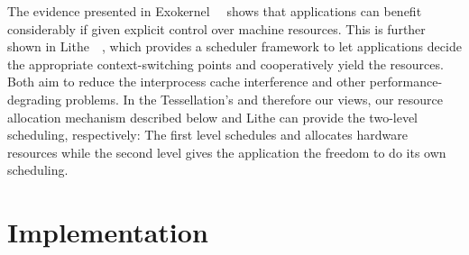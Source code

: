 \documentclass[letterpaper,twocolumn,11pt]{article}
\begin{document}
The evidence presented in Exokernel~\cite{Engler:1995:EOS:224056.224076}~\cite{Engler:1995:EOS:224057.224076} shows that applications can benefit considerably if given explicit control over machine resources. This is further shown in Lithe~\cite{Pan:2010:CPS:1809028.1806639}~\cite{Pan:2010:CPS:1806596.1806639}, which provides a scheduler framework to let applications decide the appropriate context-switching points and cooperatively yield the resources. Both aim to reduce the interprocess cache interference and other performance-degrading problems. In the Tessellation's and therefore our views, our resource allocation mechanism described below and Lithe can provide the two-level scheduling, respectively: The first level schedules and allocates hardware resources while the second level gives the application the freedom to do its own scheduling.

\section{Implementation}
\end{document}
